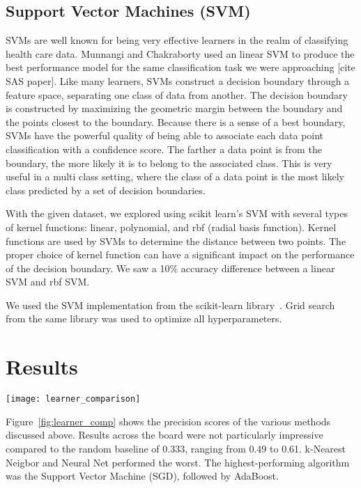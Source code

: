 \documentclass[conference]{IEEEtran}
\begin{document}
\subsection{Support Vector Machines (SVM)}
SVMs are well known for being very effective learners in the realm of classifying health care data. Munnangi and Chakraborty used an linear SVM to produce the best performance model for the same classification task we were approaching [cite SAS paper]. Like many learners, SVMs construct a decision boundary through a feature space, separating one class of data from another. The decision boundary is constructed by maximizing the geometric margin between the boundary and the points closest to the boundary. Because there is a sense of a best boundary, SVMs have the powerful quality of being able to associate each data point classification with a confidence score. The farther a data point is from the boundary, the more likely it is to belong to the associated class. This is very useful in a multi class setting, where the class of a data point is the most likely class predicted by a set of decision boundaries.

With the given dataset, we explored using scikit learn's SVM with several types of kernel functions: linear, polynomial, and rbf (radial basis function). Kernel functions are used by SVMs to determine the distance between two points. The proper choice of kernel function can have a significant impact on the performance of the decision boundary. We saw a 10\% accuracy difference between a linear SVM and rbf SVM.

We used the SVM implementation from the scikit-learn library~\cite{scikit-learn}. Grid search from the same library was used to optimize all hyperparameters.

\section{Results}

\begin{figure*}[htpb]
	\centering
	\texttt{[image: learner\_comparison]}
	\caption{Comparison of precision scores of learners on dataset with missing data deleted and no oversampling performed.}
	\label{fig:learner_comp}
\end{figure*}

Figure~\ref{fig:learner_comp} shows the precision scores of the various methods discussed above. Results across the board were not particularly impressive compared to the random baseline of 0.333, ranging from 0.49 to 0.61. k-Nearest Neigbor and Neural Net performed the worst. The highest-performing algorithm was the Support Vector Machine (SGD), followed by AdaBoost.
\end{document}
